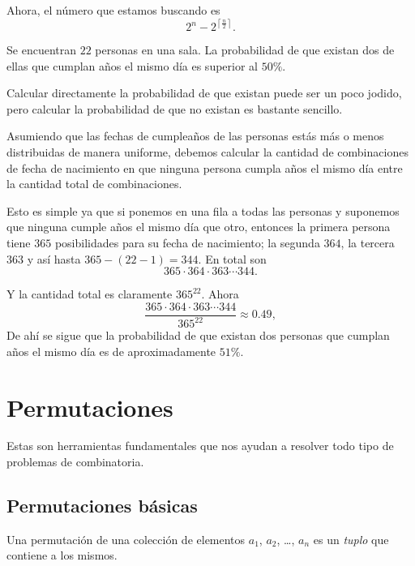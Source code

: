 Ahora, el número que estamos buscando es
\[2^n - 2^{\left\lceil\frac n2\right\rceil}.\]

\begin{example}
	Se encuentran $22$ personas en una sala.
	La probabilidad de que existan dos de ellas que
	cumplan años el mismo día es superior al $50\%$.
\end{example}

Calcular directamente la probabilidad de que
existan puede ser un poco jodido,
pero calcular la probabilidad de que
no existan es bastante sencillo.

Asumiendo que las fechas de cumpleaños de las personas
estás más o menos distribuidas de manera uniforme,
debemos calcular la cantidad de combinaciones
de fecha de nacimiento en que
ninguna persona cumpla años el mismo día entre
la cantidad total de combinaciones.

Esto es simple ya que si ponemos en una fila a
todas las personas y suponemos que ninguna cumple
años el mismo día que otro, entonces la primera
persona tiene $365$ posibilidades para su fecha de
nacimiento; la segunda $364$, la tercera $363$
y así hasta $365 - (22 - 1) = 344$.
En total son
\[365 \cdot 364 \cdot 363 \cdots 344.\]

Y la cantidad total es claramente $365^{22}$.
Ahora
\[\frac{365 \cdot 364 \cdot 363 \cdots 344}{365^{22}} \approx 0.49,\]
De ahí se sigue que la probabilidad de que existan
dos personas que cumplan años el mismo día
es de aproximadamente $51\%$.

\chapter{Permutaciones}
Estas son herramientas fundamentales que
nos ayudan a resolver todo tipo
de problemas de combinatoria.

\section{Permutaciones básicas}

\begin{definition}[Permutación]
	Una permutación de una colección
	de elementos $a_1$, $a_2$, \dots, $a_n$
	es un \textit{tuplo}\footnotemark
	que contiene a los mismos.

\end{definition}

